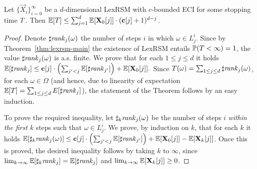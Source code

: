 \begin{theorem}
\label{thm:runtime-bound}
Let $\{\vec{X}_{i}\}_{i=0}^{\infty}$ be a 
$d$-dimensional LexRSM with $c$-bounded ECI for some stopping time $T$. 
Then $\mathbb{E}[T]\leq  
\sum_{j=1}^{d}\mathbb{E}[\mathbf{X}_{0}[j]]\cdot(\mathbf{c}[j]+1)^{d-j}$.
\end{theorem}
\begin{proof}
Denote $\sharp\mathit{rank}_j(\omega)$ the number of steps $i$ in which $\omega\in 
L_j^i$. Since by Theorem~\ref{thm:lexrsm-main} the existence of LexRSM entails 
$\mathbb{P}(T<\infty)=1$, the value $\sharp\mathit{rank}_j(\omega)$ is a.s. finite. 
We prove that for each $1\leq j \leq d$ it holds $\mathbb{E}[\sharp\mathit{rank}_j]\leq 
\mathbf{c}[j]\cdot\left(\sum_{j'<j}\mathbb{E}[\sharp\mathit{rank}_{j'}]\right) + 
\mathbb{E}[\mathbf{X}_{0}[j]].$ Since $T(\omega)=\sum_{1\leq j \leq d} 
\sharp\mathit{rank}_j(\omega)$, for each $\omega\in \Omega$ (and hence, due to 
linearity of expectation $\mathbb{E}[T]=\sum_{1\leq j \leq d} 
E[\sharp\mathit{rank}_j]$), the statement of the 
Theorem follows by an easy induction. 

To prove the required inequality, let $\sharp_{k}\mathit{rank}_{j}(\omega)$ be the number 
of steps $i$ \emph{within the first $k$} steps such that $\omega\in L_j^i$. We 
prove, by induction on $k$, that for each $k$ it holds 
$\mathbb{E}[\sharp_{k}\mathit{rank}_{j}(\omega)]\leq 
\mathbf{c}[j]\cdot\left(\sum_{j'<j}\mathbb{E}[\sharp\mathit{rank}_{j'}] \right)+ 
\mathbb{E}[\mathbf{X}_{0}[j]] - \mathbb{E}[\mathbf{X}_{k}[j]]$. Once this is proved, the 
desired inequality follows by taking $k$ to $\infty$, since 
$\lim_{k\rightarrow \infty}\mathbb{E}[\sharp_{k}\mathit{rank}_{j}] = \mathbb{E}[\sharp\mathit{rank}_j]$ and 
$\lim_{k\rightarrow \infty}\mathbb{E}[\mathbf{X}_{k}[j]] \geq 0$.
\end{proof}